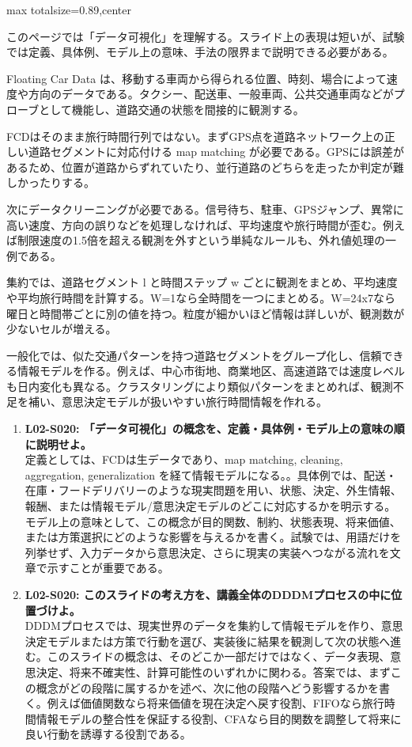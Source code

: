 \begin{minipage}[t]{0.58\textwidth}
\begin{adjustbox}{max totalsize={\textwidth}{0.89\textheight},center}
\begin{minipage}{\textwidth}\scriptsize
{}このページでは「データ可視化」を理解する。スライド上の表現は短いが、試験では定義、具体例、モデル上の意味、手法の限界まで説明できる必要がある。\par
Floating Car Data は、移動する車両から得られる位置、時刻、場合によって速度や方向のデータである。タクシー、配送車、一般車両、公共交通車両などがプローブとして機能し、道路交通の状態を間接的に観測する。\par
FCDはそのまま旅行時間行列ではない。まずGPS点を道路ネットワーク上の正しい道路セグメントに対応付ける map matching が必要である。GPSには誤差があるため、位置が道路からずれていたり、並行道路のどちらを走ったか判定が難しかったりする。\par
次にデータクリーニングが必要である。信号待ち、駐車、GPSジャンプ、異常に高い速度、方向の誤りなどを処理しなければ、平均速度や旅行時間が歪む。例えば制限速度の1.5倍を超える観測を外すという単純なルールも、外れ値処理の一例である。\par
集約では、道路セグメント l と時間ステップ w ごとに観測をまとめ、平均速度や平均旅行時間を計算する。W=1なら全時間を一つにまとめる。W=24x7なら曜日と時間帯ごとに別の値を持つ。粒度が細かいほど情報は詳しいが、観測数が少ないセルが増える。\par
一般化では、似た交通パターンを持つ道路セグメントをグループ化し、信頼できる情報モデルを作る。例えば、中心市街地、商業地区、高速道路では速度レベルも日内変化も異なる。クラスタリングにより類似パターンをまとめれば、観測不足を補い、意思決定モデルが扱いやすい旅行時間情報を作れる。\par{}\begin{enumerate}\item \textbf{L02-S020: 「データ可視化」の概念を、定義・具体例・モデル上の意味の順に説明せよ。}\\定義としては、FCDは生データであり、map matching, cleaning, aggregation, generalization を経て情報モデルになる。。具体例では、配送・在庫・フードデリバリーのような現実問題を用い、状態、決定、外生情報、報酬、または情報モデル/意思決定モデルのどこに対応するかを明示する。モデル上の意味として、この概念が目的関数、制約、状態表現、将来価値、または方策選択にどのような影響を与えるかを書く。試験では、用語だけを列挙せず、入力データから意思決定、さらに現実の実装へつながる流れを文章で示すことが重要である。\item \textbf{L02-S020: このスライドの考え方を、講義全体のDDDMプロセスの中に位置づけよ。}\\DDDMプロセスでは、現実世界のデータを集約して情報モデルを作り、意思決定モデルまたは方策で行動を選び、実装後に結果を観測して次の状態へ進む。このスライドの概念は、そのどこか一部だけではなく、データ表現、意思決定、将来不確実性、計算可能性のいずれかに関わる。答案では、まずこの概念がどの段階に属するかを述べ、次に他の段階へどう影響するかを書く。例えば価値関数なら将来価値を現在決定へ戻す役割、FIFOなら旅行時間情報モデルの整合性を保証する役割、CFAなら目的関数を調整して将来に良い行動を誘導する役割である。\end{enumerate}

\end{minipage}
\end{adjustbox}
\end{minipage}

